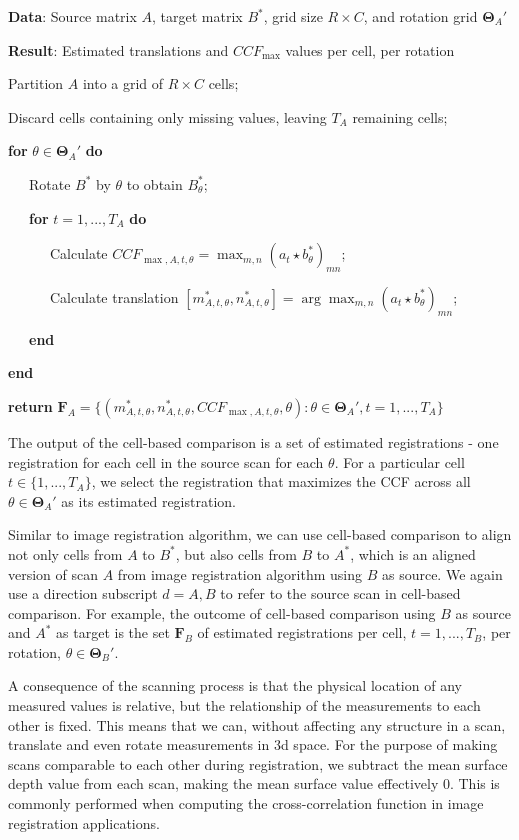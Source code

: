 \documentclass[11pt,]{isuthesis}
\begin{document}
\textbf{Data}: Source matrix \(A\), target matrix \(B^*\), grid size \(R \times C\), and rotation grid \(\pmb{\Theta}_{A}'\)

\textbf{Result}: Estimated translations and \(CCF_{\max}\) values per cell, per rotation

Partition \(A\) into a grid of \(R \times C\) cells;

Discard cells containing only missing values, leaving \(T_A\) remaining cells;

\textbf{for} \(\theta \in \pmb{\Theta}_{A}'\) \textbf{do}

~~~Rotate \(B^*\) by \(\theta\) to obtain \(B_{\theta}^*\);

~~~\textbf{for} \(t = 1,...,T_A\) \textbf{do}

~~~~~~Calculate \(CCF_{\max,A,t,\theta} = \max_{m,n} (a_t \star b_{\theta}^*)_{mn}\);

~~~~~~Calculate translation \([m_{A,t,\theta}^*, n_{A,t,\theta}^*] = \arg \max_{m,n} (a_t \star b_{\theta}^*)_{mn}\);

~~~\textbf{end}

\textbf{end}

\textbf{return} \(\pmb{F}_A = \{(m_{A,t,\theta}^*, n_{A,t,\theta}^*, CCF_{\max,A,t,\theta}, \theta) : \theta \in \pmb{\Theta}_{A}', t = 1,...,T_A\}\)

The output of the cell-based comparison is a set of estimated registrations - one registration for each cell in the source scan for each \(\theta\).
For a particular cell \(t \in \{1,...,T_A\}\), we select the registration that maximizes the CCF across all \(\theta \in \pmb{\Theta}_A'\) as its estimated registration.

Similar to image registration algorithm, we can use cell-based comparison to align not only cells from \(A\) to \(B^*\), but also cells from \(B\) to \(A^*\), which is an aligned version of scan \(A\) from image registration algorithm using \(B\) as source.
We again use a direction subscript \(d = A,B\) to refer to the source scan in cell-based comparison.
For example, the outcome of cell-based comparison using \(B\) as source and \(A^*\) as target is the set \(\pmb{F}_B\) of estimated registrations per cell, \(t = 1,...,T_B\), per rotation, \(\theta \in \pmb{\Theta}_B'\).

A consequence of the scanning process is that the physical location of any measured values is relative, but the relationship of the measurements to each other is fixed. This means that we can, without affecting any structure in a scan, translate and even rotate measurements in 3d space. For the purpose of making scans comparable to each other during registration, we subtract the mean surface depth value from each scan, making the mean surface value effectively 0.
This is commonly performed when computing the cross-correlation function in image registration applications.
\end{document}
